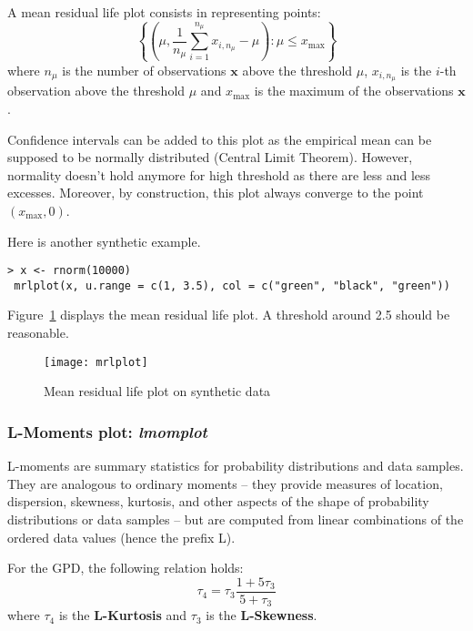 \documentclass[11pt,a4paper]{article}
\numberwithin{equation}{section}
\theoremstyle{definition}
\begin{document}
A mean residual life plot consists in representing points:
\begin{equation}
  \label{eq:mrlplot}
  \left\{\left(\mu, \frac{1}{n_\mu} \sum_{i=1}^{n_\mu} x_{i, n_\mu} -
      \mu \right) : \mu \leq x_\mathrm{max} \right\}
\end{equation}
where $n_\mu$ is the number of observations $\mathbf{x}$ above the
threshold $\mu$, $x_{i, n_\mu}$ is the $i$-th observation above the
threshold $\mu$ and $x_\mathrm{max}$ is the maximum of the
observations $\mathbf{x}$.

Confidence intervals can be added to this plot as the empirical mean
can be supposed to be normally distributed (Central Limit
Theorem). However, normality doesn't hold anymore for high threshold
as there are less and less excesses. Moreover, by construction, this
plot always converge to the point $(x_\mathrm{max}, 0)$.

Here is another synthetic example.
\begin{verbatim}
> x <- rnorm(10000)
 mrlplot(x, u.range = c(1, 3.5), col = c("green", "black", "green"))
\end{verbatim}

Figure~\ref{fig:mrlplot} displays the mean residual life plot. A
threshold around 2.5 should be reasonable.
\begin{figure}
  \centering
  \texttt{[image: mrlplot]}
  \caption{Mean residual life plot on synthetic data}
  \label{fig:mrlplot}
\end{figure}

\subsubsection{L-Moments plot: \emph{lmomplot}}

L-moments are summary statistics for probability distributions and
data samples. They are analogous to ordinary moments -- they provide
measures of location, dispersion, skewness, kurtosis, and other
aspects of the shape of probability distributions or data samples --
but are computed from linear combinations of the ordered data values
(hence the prefix L).

For the GPD, the following relation holds:
\begin{equation}
  \label{eq:lomRel}
  \tau_4 = \tau_3 \frac{1 + 5 \tau_3}{5 + \tau_3}
\end{equation}
where $\tau_4$ is the \textbf{L-Kurtosis} and $\tau_3$ is the
\textbf{L-Skewness}.
\end{document}
